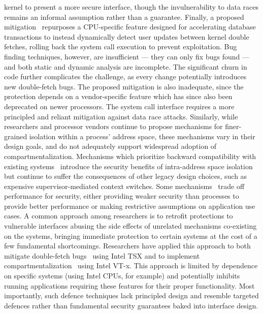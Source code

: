 kernel to present a more secure interface, though the invulnerability to 
data races remains an informal assumption rather than a guarantee.
Finally, a proposed mitigation~\cite{schwartzDECAF} repurposes a CPU-specific
feature
designed for accelerating database transactions to instead dynamically
detect user updates between kernel double fetches, rolling back the
system call execution to prevent exploitation.
Bug finding techniques, however, are insufficient --- they can only fix
bugs found --- and both static and dynamic analysis are incomplete.
The significant churn in code further complicates the challenge, as every
change potentially introduces new double-fetch bugs.
The proposed mitigation is also inadequate, since the protection depends on
a vendor-specific feature which has since also been deprecated on newer
processors.
The system call interface requires a more principled and reliant
mitigation against data race attacks.
Similarly, while researchers and processor vendors continue to propose 
mechanisms for finer-grained isolation within a process' address space, 
these mechanisms vary in their design goals, and do not adequately
support widespread adoption of compartmentalization.
Mechanisms which prioritize backward compatibility with existing 
systems~\cite{LittonVE0BD16, HsuHEP16, HedayatiGJCSSM19Hodor, LeeSK18, DuHXZC19XPC}
introduce the security benefits of intra-address space isolation
but continue to suffer the consequences of other legacy design choices, 
such as expensive supervisor-mediated context switches.
Some mechanisms~\cite{ParkLXMK19, HedayatiGJCSSM19Hodor} trade off 
performance for security, either providing weaker security than processes
to provide better performance or making restrictive assumptions on
application use cases.
A common approach among researchers is to retrofit protections to vulnerable
interfaces abusing the side effects of unrelated mechanisms co-existing on
the systems, bringing immediate protection to certain systems at the cost
of a few fundamental shortcomings.
Researchers have applied this approach to both mitigate double-fetch
bugs~\cite{schwartzDECAF} using Intel TSX and to implement 
compartmentalization~\cite{HedayatiGJCSSM19Hodor,LeeSK18} using Intel VT-x.
This approach is limited by dependence on specific 
systems (using Intel CPUs, for example) and potentially
inhibits running applications requiring these features for their proper 
functionality.
Most importantly, such defence techniques lack principled design and 
resemble targeted defences rather than 
fundamental security guarantees baked into interface design.

